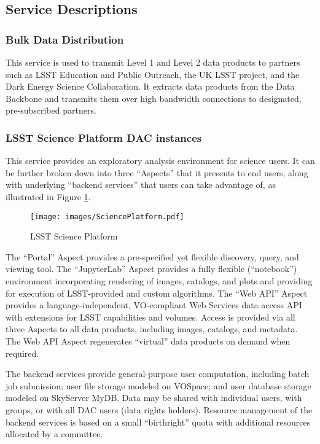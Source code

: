 \documentclass[DM,lsstdraft,toc]{lsstdoc}
\begin{document}
\subsection{Service Descriptions}\label{dac-service-descriptions}

\subsubsection{Bulk Data Distribution}\label{bulk-data-distribution}

This service is used to transmit Level 1 and Level 2 data products to
partners such as LSST Education and Public Outreach, the UK LSST
project, and the Dark Energy Science Collaboration. It extracts data
products from the Data Backbone and transmits them over high bandwidth
connections to designated, pre-subscribed partners.

\subsubsection{LSST Science Platform DAC
instances}\label{lsst-science-platform-dac-instances}

This service provides an exploratory analysis environment for science
users. It can be further broken down into three ``Aspects'' that it
presents to end users, along with underlying ``backend services'' that
users can take advantage of, as illustrated in Figure \ref{fig:lsp}.

\begin{figure}
\centering
\texttt{[image: images/SciencePlatform.pdf]}
\caption{LSST Science Platform}
\label{fig:lsp}
\end{figure}

The ``Portal'' Aspect provides a pre-specified yet flexible discovery,
query, and viewing tool. The ``JupyterLab'' Aspect provides a fully
flexible (``notebook'') environment incorporating rendering of images,
catalogs, and plots and providing for execution of LSST-provided and
custom algorithms. The ``Web API'' Aspect provides a
language-independent, VO-compliant Web Services data access API with
extensions for LSST capabilities and volumes. Access is provided via all
three Aspects to all data products, including images, catalogs, and
metadata. The Web API Aspect regenerates ``virtual'' data products on
demand when required.

The backend services provide general-purpose user computation, including
batch job submission; user file storage modeled on VOSpace; and user
database storage modeled on SkyServer MyDB. Data may be shared with
individual users, with groups, or with all DAC users (data rights
holders). Resource management of the backend services is based on a
small ``birthright'' quota with additional resources allocated by a
committee.
\end{document}
